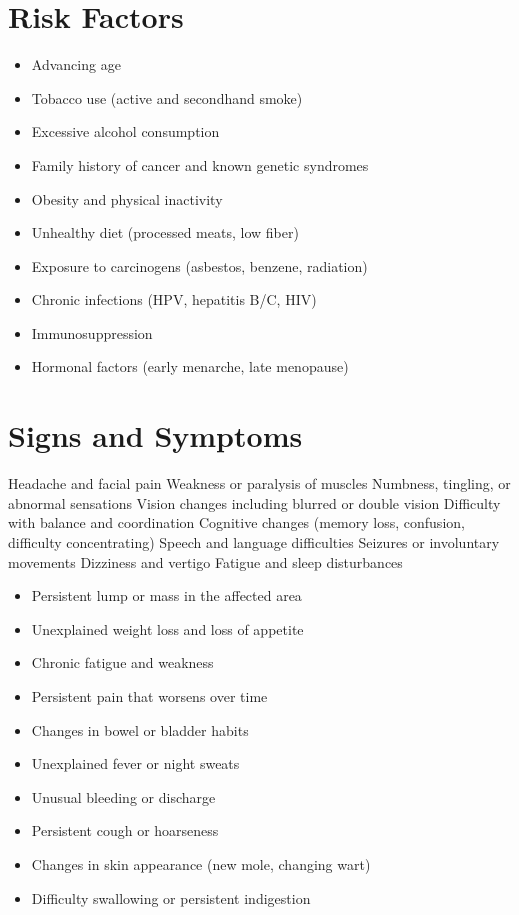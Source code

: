\section{Risk Factors}
\begin{itemize}[noitemsep]
  \item Advancing age
  \item Tobacco use (active and secondhand smoke)
  \item Excessive alcohol consumption
  \item Family history of cancer and known genetic syndromes
  \item Obesity and physical inactivity
  \item Unhealthy diet (processed meats, low fiber)
  \item Exposure to carcinogens (asbestos, benzene, radiation)
  \item Chronic infections (HPV, hepatitis B/C, HIV)
  \item Immunosuppression
  \item Hormonal factors (early menarche, late menopause)
\end{itemize}
\section{Signs and Symptoms}
Headache and facial pain Weakness or paralysis of muscles Numbness, tingling, or abnormal sensations Vision changes including blurred or double vision Difficulty with balance and coordination Cognitive changes (memory loss, confusion, difficulty concentrating) Speech and language difficulties Seizures or involuntary movements Dizziness and vertigo Fatigue and sleep disturbances

\begin{itemize}[noitemsep]
  \item Persistent lump or mass in the affected area
  \item Unexplained weight loss and loss of appetite
  \item Chronic fatigue and weakness
  \item Persistent pain that worsens over time
  \item Changes in bowel or bladder habits
  \item Unexplained fever or night sweats
  \item Unusual bleeding or discharge
  \item Persistent cough or hoarseness
  \item Changes in skin appearance (new mole, changing wart)
  \item Difficulty swallowing or persistent indigestion
\end{itemize}
